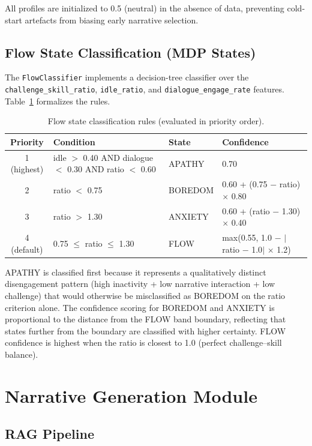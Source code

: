 \documentclass[12pt,a4paper]{report}
\begin{document}
All profiles are initialized to 0.5 (neutral) in the absence of data, preventing cold-start artefacts from biasing early narrative selection.

\subsection{Flow State Classification (MDP States)}

The \texttt{FlowClassifier} implements a decision-tree classifier over the \texttt{challenge\_skill\_ratio}, \texttt{idle\_ratio}, and \texttt{dialogue\_engage\_rate} features. Table~\ref{tab:flow_rules} formalizes the rules.

\begin{table}[H]
\centering
\caption{Flow state classification rules (evaluated in priority order).}
\label{tab:flow_rules}
\small
\begin{tabular}{@{}clll@{}}
\toprule
\textbf{Priority} & \textbf{Condition} & \textbf{State} & \textbf{Confidence} \\
\midrule
1 (highest) & idle $>$ 0.40 AND dialogue $<$ 0.30 AND ratio $<$ 0.60 & APATHY & 0.70 \\
2 & ratio $<$ 0.75 & BOREDOM & 0.60 + (0.75 $-$ ratio) $\times$ 0.80 \\
3 & ratio $>$ 1.30 & ANXIETY & 0.60 + (ratio $-$ 1.30) $\times$ 0.40 \\
4 (default) & 0.75 $\leq$ ratio $\leq$ 1.30 & FLOW & max(0.55, 1.0 $-$ $|$ratio $-$ 1.0$|$ $\times$ 1.2) \\
\bottomrule
\end{tabular}
\end{table}

APATHY is classified first because it represents a qualitatively distinct disengagement pattern (high inactivity + low narrative interaction + low challenge) that would otherwise be misclassified as BOREDOM on the ratio criterion alone. The confidence scoring for BOREDOM and ANXIETY is proportional to the distance from the FLOW band boundary, reflecting that states further from the boundary are classified with higher certainty. FLOW confidence is highest when the ratio is closest to 1.0 (perfect challenge--skill balance).

\section{Narrative Generation Module}

\subsection{RAG Pipeline}
\end{document}
